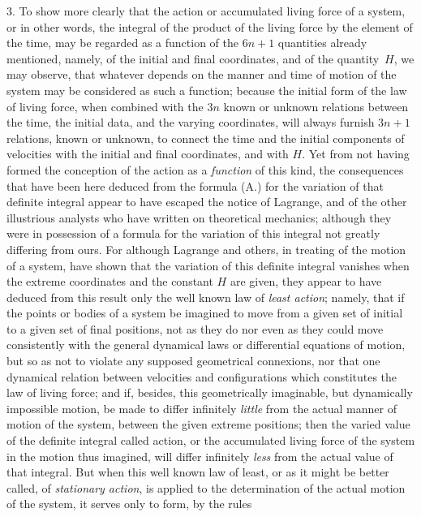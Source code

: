 3.
To show more clearly that the action or accumulated living force
of a system, or in other words, the integral of the product of
the living force by the element of the time, may be regarded as
a function of the $6n + 1$ quantities already mentioned, namely,
of the initial and final coordinates, and of the quantity~$H$,
we may observe, that whatever depends on the manner and time of
motion of the system may be considered as such a function;
because the initial form of the law of living force, when
combined with the $3n$ known or unknown relations between the
time, the initial data, and the varying coordinates, will always
furnish $3n + 1$ relations, known or unknown, to connect the time
and the initial components of velocities with the initial and
final coordinates, and with $H$.  Yet from not having formed the
conception of the action as a {\it function\/} of this kind, the
consequences that have been here deduced from the formula (A.)
for the variation of that definite integral appear to have
escaped the notice of {\sc Lagrange}, and of the other illustrious
analysts who have written on theoretical mechanics; although they
were in possession of a formula for the variation of this
integral not greatly differing from ours.  For although {\sc Lagrange}
and others, in treating of the motion of a system, have shown
that the variation of this definite integral vanishes when the
extreme coordinates and the constant $H$ are given, they appear
to have deduced from this result only the well known law of
{\it least action\/}; namely, that if the points or bodies of a
system be imagined to move from a given set of initial to a given
set of final positions, not as they do nor even as they could
move consistently with the general dynamical laws or differential
equations of motion, but so as not to violate any supposed
geometrical connexions, nor that one dynamical relation between
velocities and configurations which constitutes the law of
living force; and if, besides, this geometrically imaginable, but
dynamically impossible motion, be made to differ infinitely
{\it little\/} from the actual manner of motion of the system,
between the given extreme positions; then the varied value of the
definite integral called action, or the accumulated living force
of the system in the motion thus imagined, will differ infinitely
{\it less\/} from the actual value of that integral.  But when
this well known law of least, or as it might be better called, of
{\it stationary action}, is applied to the determination of the
actual motion of the system, it serves only to form, by the rules
